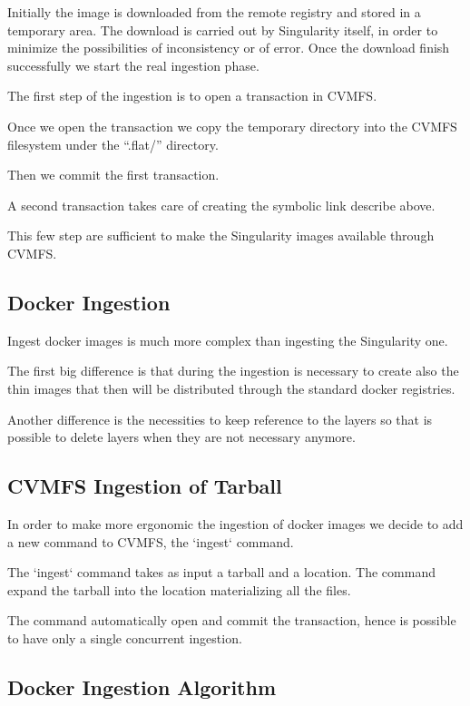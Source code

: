 Initially the image is downloaded from the remote registry and stored in a temporary area. The download is carried out by Singularity itself, in order to minimize the possibilities of inconsistency or of error. Once the download finish successfully we start the real ingestion phase.

The first step of the ingestion is to open a transaction in CVMFS.

Once we open the transaction we copy the temporary directory into the CVMFS filesystem under the “.flat/” directory.

Then we commit the first transaction.

A second transaction takes care of creating the symbolic link describe above.

This few step are sufficient to make the Singularity images available through CVMFS.

\subsection{Docker Ingestion}

Ingest docker images is much more complex than ingesting the Singularity one.

The first big difference is that during the ingestion is necessary to create also the thin images that then will be distributed through the standard docker registries.

Another difference is the necessities to keep reference to the layers so that is possible to delete layers when they are not necessary anymore.

\subsection{CVMFS Ingestion of Tarball}

In order to make more ergonomic the ingestion of docker images we decide to add a new command to CVMFS, the `ingest` command.

The `ingest` command takes as input a tarball and a location. The command expand the tarball into the location materializing all the files.

The command automatically open and commit the transaction, hence is possible to have only a single concurrent ingestion.

\subsection{Docker Ingestion Algorithm}

